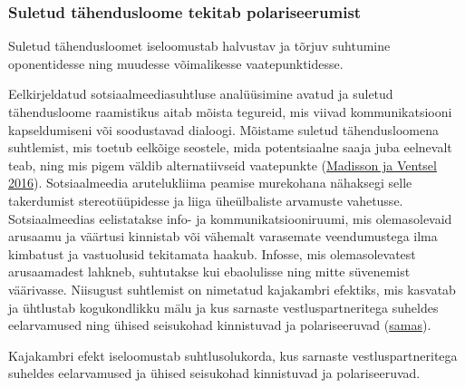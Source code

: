 \documentclass[estonian,]{article}
\begin{document}
\hypertarget{suletud-tuxe4hendusloome-tekitab-polariseerumist}{%
\subsubsection*{Suletud tähendusloome tekitab polariseerumist}\label{suletud-tuxe4hendusloome-tekitab-polariseerumist}}

\begin{blockquote-right}
Suletud tähendusloomet iseloomustab halvustav ja tõrjuv suhtumine
oponentidesse ning muudesse võimalikesse vaatepunktidesse.
\end{blockquote-right}

Eelkirjeldatud sotsiaalmeediasuhtluse analüüsimine avatud ja suletud tähendusloome raamistikus aitab mõista tegureid, mis viivad kommunikatsiooni kapseldumiseni või soodustavad dialoogi. Mõistame suletud tähendusloomena suhtlemist, mis toetub eelkõige seostele, mida potentsiaalne saaja juba eelnevalt teab, ning mis pigem väldib alternatiivseid vaatepunkte (\protect\hyperlink{Madisson-Ventsel2016}{Madisson ja Ventsel 2016}). Sotsiaalmeedia arutelukliima peamise murekohana nähaksegi selle takerdumist stereotüüpidesse ja liiga üheülbaliste arvamuste vahetusse. Sotsiaalmeedias eelistatakse info- ja kommunikatsiooniruumi, mis olemasolevaid arusaamu ja väärtusi kinnistab või vähemalt varasemate veendumustega ilma kimbatust ja vastuolusid tekitamata haakub. Infosse, mis olemasolevatest arusaamadest lahkneb, suhtutakse kui ebaolulisse ning mitte süvenemist väärivasse. Niisugust suhtlemist on nimetatud kajakambri efektiks, mis kasvatab ja ühtlustab kogukondlikku mälu ja kus sarnaste vestluspartneritega suheldes eelarvamused ning ühised seisukohad kinnistuvad ja polariseeruvad (\protect\hyperlink{Madisson-Ventsel2016}{samas}).

\begin{blockquote-left}
Kajakambri efekt iseloomustab suhtlusolukorda, kus sarnaste
vestluspartneritega suheldes eelarvamused ja ühised seisukohad
kinnistuvad ja polariseeruvad.
\end{blockquote-left}
\end{document}
